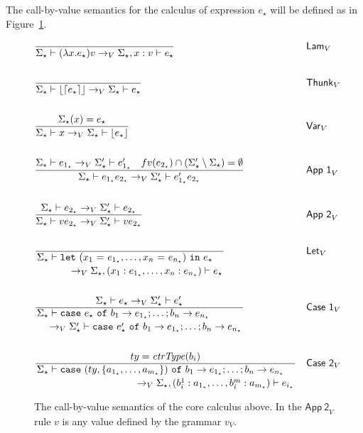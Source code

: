 \documentclass[float=false, crop=false]{standalone}
\numberwithin{subcase}{case}
\newcommand{\tlang}{\star}
\newcommand{\thunk}[1]{\lceil #1 \rceil}
\newcommand{\unwrap}[1]{\lfloor #1 \rfloor}
\newcommand{\tcbv}{\rightarrow_V}
\begin{document}
The call-by-value semantics for the calculus of expression $e_\tlang$ 
will be defined as in Figure~\ref{t:cbv}.

\begin{figure}
\begin{align*}
  &\frac{}{\Sigma_\tlang \vdash (\lambda x.e_\tlang)v \tcbv \Sigma_\tlang,x:v \vdash e_\tlang } && \mathsf{Lam}_V \\ \\
  &\frac{}{\Sigma_\tlang \vdash \unwrap{\thunk{e_\tlang}} \tcbv \Sigma_\tlang \vdash e_\tlang} 
  && \mathsf{Thunk}_V \\ \\
  &\frac{\Sigma_\tlang(x) = e_\tlang}{\Sigma_\tlang \vdash x \tcbv \Sigma_\tlang \vdash \unwrap{e_\tlang} } 
     && \mathsf{Var}_V\\ \\
  &\frac{\Sigma_\tlang \vdash   e_{1_\tlang}\tcbv \Sigma_\tlang' \vdash 
    e_{1_\tlang}' \quad fv(e_{2_\tlang}) 
    \cap (\Sigma'_\tlang \setminus \Sigma_\tlang) = 
    \emptyset }{\Sigma_\tlang \vdash e_{1_\tlang} e_{2_\tlang} \tcbv 
    \Sigma_\tlang' \vdash e_{1_\tlang}' e_{2_\tlang}} && \mathsf{App\ 1}_V\\\\
  &\frac{\Sigma_\tlang \vdash e_{2_\tlang} \tcbv \Sigma_\tlang'\vdash 
    e_{2_\tlang}}
  {\Sigma_\tlang \vdash v e_{2_\tlang} \tcbv 
    \Sigma_\tlang' \vdash v e_{2_\tlang}} && \mathsf{App\ 2}_V  \\ \\
  &\dfrac{}{\splitdfrac{\Sigma_\tlang \vdash 
\mathtt{let}\ (x_1\ \mathtt{=}\ e_{1_\tlang},\dotsc, x_n\ \mathtt{=}\
e_{n_\tlang})\ \mathtt{in}\ e_\tlang}
    {\tcbv \Sigma_\tlang,(x_1:e_{1_\tlang},\dotsc,x_n:e_{n_\tlang})
      \vdash e_\tlang}} && \mathsf{Let}_V  \\ \\
  &\dfrac{\Sigma_\tlang \vdash e_\tlang \tcbv \Sigma_\tlang' \vdash e'_\tlang}
  {\splitdfrac{\Sigma_\tlang \vdash 
  \mathtt{case}\ e_\tlang\ \mathtt{of}\ b_1 \rightarrow e_{1_\tlang}; 
  \dots; b_n \rightarrow e_{n_\tlang}}
  {\tcbv \Sigma_\tlang' \vdash\mathtt{case}\ e_\tlang'\ 
    \mathtt{of}\ b_1 \rightarrow e_{1_\tlang}; 
    \dots; b_n \rightarrow e_{n_\tlang}}} 
      && \mathsf{Case\ 1}_V \\\\
  &\dfrac{ty = \mathit{ctrType}(b_i)}{\splitdfrac{\Sigma_\tlang \vdash 
  \mathtt{case}\ (ty,\{a_{1_\tlang},\dotsc,a_{m_\tlang}\})
  \ \mathtt{of}\ b_1 \rightarrow e_{1_\tlang};
  \dots; b_n \rightarrow e_{n_\tlang}}
  {\tcbv \Sigma_\tlang,(b_i^1:a_{1_\tlang},\dotsc,b_i^m:a_{m_\tlang})
    \vdash e_{i_\tlang}}} && \mathsf{Case\ 2}_V 
\end{align*}
\caption[The call-by-value semantics of calculus$_\tlang$]{The call-by-value semantics of the core calculus above. In the 
  $\mathsf{App\ 2}_V$ rule $v$ is any value defined by the grammar $v_V$.}
\label{t:cbv}
\end{figure}
\end{document}
